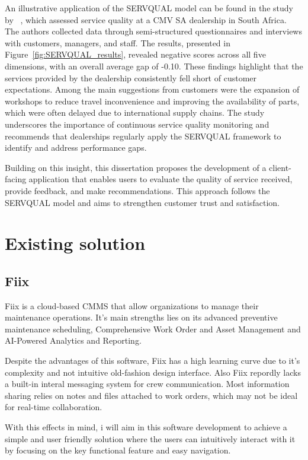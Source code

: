 An illustrative application of the SERVQUAL model can be found in the study by ~\citet{Measuring_After_sales_Service_Quality}, which assessed service quality at a CMV SA dealership in South Africa. The authors collected data through semi-structured questionnaires and interviews with customers, managers, and staff. The results, presented in Figure~\ref{fig:SERVQUAL_results}, revealed negative scores across all five dimensions, with an overall average gap of -0.10. These findings highlight that the services provided by the dealership consistently fell short of customer expectations. Among the main suggestions from customers were the expansion of workshops to reduce travel inconvenience and improving the availability of parts, which were often delayed due to international supply chains. The study underscores the importance of continuous service quality monitoring and recommends that dealerships regularly apply the SERVQUAL framework to identify and address performance gaps.

Building on this insight, this dissertation proposes the development of a client-facing application that enables users to evaluate the quality of service received, provide feedback, and make recommendations. This approach follows the SERVQUAL model and aims to strengthen customer trust and satisfaction.
\section{Existing solution}

\subsection{Fiix}
Fiix is a cloud-based \ac{CMMS} that allow organizations to manage their maintenance operations. 
It's main strengths lies on its advanced preventive maintenance scheduling, Comprehensive Work Order and Asset Management and AI-Powered Analytics and Reporting.

Despite the advantages of this software, Fiix has a high learning curve due to it's complexity and not intuitive old-fashion design interface. 
Also Fiix repordly lacks a built-in interal messaging system for crew communication. Most information sharing relies on notes and files attached to work orders, which may not be ideal for real-time collaboration.

With this effects in mind, i will aim in this software development to achieve a simple and user friendly solution where the users can intuitively interact with it by focusing on the key functional feature and easy navigation.


